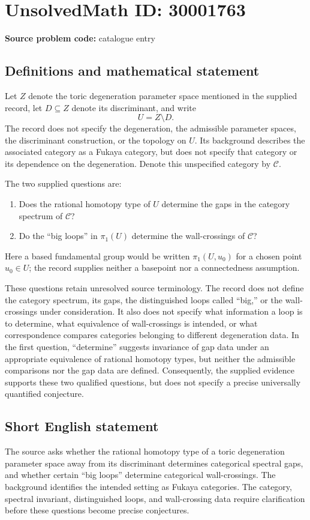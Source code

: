 \documentclass[11pt]{article}
\begin{document}
\section*{UnsolvedMath ID: 30001763}
\textbf{Source problem code:} catalogue entry
\subsection{Definitions and mathematical statement}
Let \(Z\) denote the toric degeneration parameter space mentioned in the supplied record, let \(D\subseteq Z\) denote its discriminant, and write
\[
U=Z\setminus D.
\]
The record does not specify the degeneration, the admissible parameter spaces, the discriminant construction, or the topology on \(U\). Its background describes the associated category as a Fukaya category, but does not specify that category or its dependence on the degeneration. Denote this unspecified category by \(\mathcal C\).

The two supplied questions are:
\begin{enumerate}
\item Does the rational homotopy type of \(U\) determine the gaps in the category spectrum of \(\mathcal C\)?
\item Do the ``big loops'' in \(\pi_1(U)\) determine the wall-crossings of \(\mathcal C\)?
\end{enumerate}
Here a based fundamental group would be written \(\pi_1(U,u_0)\) for a chosen point \(u_0\in U\); the record supplies neither a basepoint nor a connectedness assumption.

These questions retain unresolved source terminology. The record does not define the category spectrum, its gaps, the distinguished loops called ``big,'' or the wall-crossings under consideration. It also does not specify what information a loop is to determine, what equivalence of wall-crossings is intended, or what correspondence compares categories belonging to different degeneration data. In the first question, ``determine'' suggests invariance of gap data under an appropriate equivalence of rational homotopy types, but neither the admissible comparisons nor the gap data are defined. Consequently, the supplied evidence supports these two qualified questions, but does not specify a precise universally quantified conjecture.
\subsection{Short English statement}
The source asks whether the rational homotopy type of a toric degeneration parameter space away from its discriminant determines categorical spectral gaps, and whether certain ``big loops'' determine categorical wall-crossings. The background identifies the intended setting as Fukaya categories. The category, spectral invariant, distinguished loops, and wall-crossing data require clarification before these questions become precise conjectures.
\end{document}
